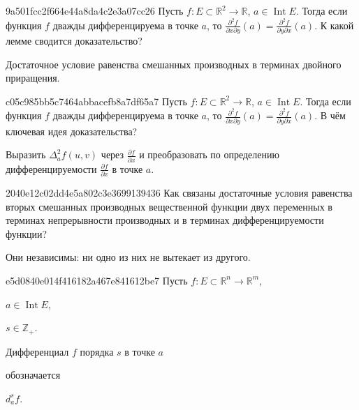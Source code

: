 \begin{note}{9a501fcc2f664e44a8da4c2e3a07cc26}
    Пусть \({ f : E \subset \mathbb R^2 \to \mathbb R }\),\: \({ a \in \operatorname{Int} E }\).
    Тогда если функция \({ f }\) дважды дифференцируема в точке \({ a }\),
    то \({ \frac{\partial^2 f}{\partial x \partial y}(a) = \frac{\partial^2 f}{\partial y \partial x}(a) }\).
    К какой лемме сводится доказательство?

    \begin{cloze}{1}
        Достаточное условие равенства смешанных производных в терминах двойного приращения.
    \end{cloze}
\end{note}

\begin{note}{c05c985bb5c7464abbacefb8a7df65a7}
    Пусть \({ f : E \subset \mathbb R^2 \to \mathbb R }\),\: \({ a \in \operatorname{Int} E }\).
    Тогда если функция \({ f }\) дважды дифференцируема в точке \({ a }\),
    то \({ \frac{\partial^2 f}{\partial x \partial y}(a) = \frac{\partial^2 f}{\partial y \partial x}(a) }\).
    В чём ключевая идея доказательства?

    \begin{cloze}{1}
        Выразить \({ \Delta_{a}^2 f(u, v) }\) через \({ \frac{\partial f}{\partial x} }\) и преобразовать по определению дифференцируемости \({ \frac{\partial f}{\partial x} }\) в точке \({ a }\).
    \end{cloze}
\end{note}

\begin{note}{2040e12c02dd4e5a802c3e3699139436}
    Как связаны достаточные условия равенства вторых смешанных производных вещественной функции двух переменных в терминах
    непрерывности производных и в терминах дифференцируемости функции?

    \begin{cloze}{1}
        Они независимы: ни одно из них не вытекает из другого.
    \end{cloze}
\end{note}

\begin{note}{e5d0840e014f416182a467e841612be7}
    Пусть \({ f : E \subset \mathbb R^{n} \to \mathbb R^{m} }\),\: \begin{icloze}{4}\({ a \in \operatorname{Int} E }\),\end{icloze}\: \begin{icloze}{3}\({ s \in \mathbb Z_+ }\).\end{icloze}
    \begin{icloze}{1}Дифференциал \({ f }\) порядка \({ s }\) в точке \({ a }\)\end{icloze} обозначается \begin{icloze}{2}\({ d_{a}^{s}f }\).\end{icloze}
\end{note}

